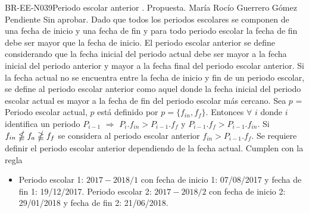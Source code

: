 \begin{BusinessRule}{BR-EE-N039}{Periodo escolar anterior}
	{\bcIntegridad}    %
	{\btEnabler}     %
	{\blControlling}    %
	.
	\BRItem[Estado] Propuesta.
	 María Rocío Guerrero Gómez
	 Pendiente
	 Sin aprobar.
	\BRItem[Descripción] Dado que todos los periodos escolares se componen de una fecha de inicio y una fecha de fin y para todo periodo escolar la fecha de fin debe ser mayor que la fecha de inicio. El periodo escolar anterior se define considerando que la fecha inicial del periodo actual debe ser mayor a la fecha inicial del periodo anterior y mayor a la fecha final del periodo escolar anterior. 
	Si la fecha actual no se encuentra entre la fecha de inicio y fin de un periodo escolar, se define al periodo escolar anterior como aquel donde la fecha inicial del periodo escolar actual es mayor a la fecha de fin del periodo escolar más cercano.
	\BRItem[Sentencia] Sea $p$ = Periodo escolar actual, $p$ está definido por $p = \{f_{in},f_{f}\}$. Entonces $\forall$ $i$ donde $i$ identifica un periodo $P_{i-1}$ $\Rightarrow$ $P_{i}.f_{in} > P_{i-1}.f_{f}$ y $P_{i-1}.f_{f} > P_{i-1}.f_{in}$.
	Si $f_{in} \nleqq f_{a} \ngeqq f_{f}$ se considera al periodo escolar anterior $f_{in} > P_{i-1}.f_{f}$.
	\BRItem[Motivación] Se requiere definir el periodo escolar anterior dependiendo de la fecha actual.
	 Cumplen con la regla
	\begin{itemize}
		\item Periodo escolar 1: $2017-2018/1$ con fecha de inicio 1: 07/08/2017 y fecha de fin 1: 19/12/2017. Periodo escolar 2: $2017-2018/2$ con fecha de inicio 2: 29/01/2018 y fecha de fin 2: 21/06/2018.\\

\end{itemize}
\end{BusinessRule}
